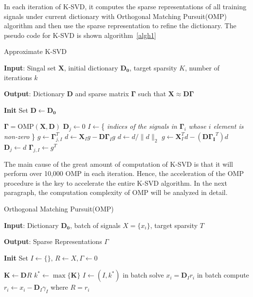 \documentclass[english]{cccconf}
\begin{document}
In each iteration of K-SVD, it computes the sparse representations of all training signals under current dictionary with Orthogonal Matching Pursuit(OMP) algorithm and then use the sparse representation to refine the dictionary. The pseudo code for K-SVD is shown algorithm~\ref{algh1}

\begin{algorithm}[H]
	\caption{Approximate K-SVD} 
	\label{algh1}
	\begin{algorithmic}
		\STATE \textbf{Input}: Singal set \(\mathbf{X}\), initial dictionary \(\mathbf{D_0}\), target sparsity \(K\), number of iterations \(k\)   
		
		\STATE \textbf{Output}: Dictionary \(\mathbf{D}\) and sparse matrix \(\mathbf{\Gamma}\) such that \(\mathbf{X}\approx\mathbf{D\Gamma}\)
		
		\STATE \textbf{Init} Set \(\mathbf{D}\leftarrow\mathbf{D_0}\)
		
		\STATE \(\mathbf{\Gamma}=\mathrm{OMP}(\mathbf{X},\mathbf{D})\)
		\STATE \(\mathbf{D}_j\leftarrow0\)
		\STATE \(I\leftarrow\)\{ \textsl{indices of the signals in \(\mathbf{\Gamma}_i\) whose \(i\) element is non-zero}  \}
		\STATE \(g\leftarrow\mathbf{\Gamma}^T_{j,I}\)
		\STATE \(d \leftarrow \mathbf{X}_{I}g - \mathbf{D\Gamma}_{I}g\)
		\STATE \(d \leftarrow d/\lVert d\rVert_2\)
		\STATE \(g \leftarrow \mathbf{X}_I^Td-(\mathbf{D\Gamma_I}^T)d\)
		\STATE \(\mathbf{D}_j \leftarrow d  \)
		\STATE \(\mathbf{\Gamma}_{j,I} \leftarrow g^T \)
		\ENDFOR
		\ENDFOR
	\end{algorithmic}
\end{algorithm}

The main cause of the great amount of computation of K-SVD is that it will perform over 10,000 OMP in each iteration. Hence, the acceleration of  the OMP procedure is the key to accelerate the entire K-SVD algorithm. In the next paragraph, the computation complexity of OMP will be analyzed in detail. 

\begin{algorithm}[H]
	\caption{Orthogonal Matching Pursuit(OMP)} 
	\label{algh2}
	\begin{algorithmic}
		\STATE \textbf{Input}: Dictionary \(\mathbf{D_0}\), batch of signals \(X = \{x_i\}\), target sparsity \(T\)   
		
		\STATE \textbf{Output}: Sparse Representations \(\Gamma\) 
		
		\STATE \textbf{Init} Set \(I\leftarrow\{\},\,R\leftarrow X,\Gamma\leftarrow0\)
		
		\FOR {\(i=1,\dots,T\)}
		\STATE \(\mathbf{K}\leftarrow \mathbf{D}R \)
		\STATE \(k^* \leftarrow \max{\{\mathbf{K}\}}\)
		\STATE \(I \leftarrow (I,k^*)\)
		\STATE in batch solve \(x_i = \mathbf{D}_Ir_i\)
		\STATE in batch compute \(r_i\leftarrow x_i - \mathbf{D}_I\gamma_I\) where \(R = {r_i}\)
		\ENDFOR
	\end{algorithmic}
\end{algorithm}
\end{document}
